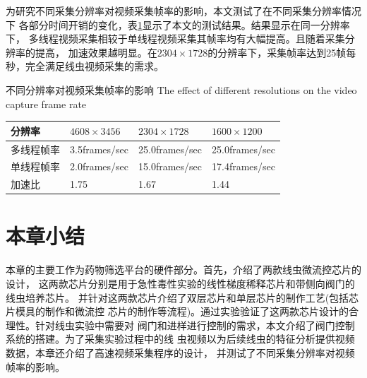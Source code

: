 	为研究不同采集分辨率对视频采集帧率的影响，本文测试了在不同采集分辨率情况下
	各部分时间开销的变化，表\ref{tab:resolutions}显示了本文的测试结果。结果显示在同一分辨率下，
	多线程视频采集相较于单线程视频采集其帧率均有大幅提高。且随着采集分辨率的提高，
	加速效果越明显。在$2304\times1728$的分辨率下，采集帧率达到25帧每秒，完全满足线虫视频采集的需求。
	\begin{table}[thbp]
	\centering
	\bicaption
    {不同分辨率对视频采集帧率的影响}
    {The effect of different resolutions on the video capture frame rate}
	\label{tab:resolutions}
	\begin{tabular}{p{80pt}p{80pt}p{80pt}p{80pt}}
	\toprule
	分辨率 & $4608\times3456$ & $2304\times1728$ & $1600\times1200$ \\
	\midrule
	多线程帧率 & 3.5frames/sec & 25.0frames/sec & 25.0frames/sec \\
	单线程帧率 & 2.0frames/sec  &15.0frames/sec &  17.4frames/sec \\
	加速比		&  1.75		  &   1.67        &  1.44 \\
	\bottomrule
	\end{tabular}
	\end{table}
\section{本章小结}
	本章的主要工作为药物筛选平台的硬件部分。首先，介绍了两款线虫微流控芯片的设计，
	这两款芯片分别是用于急性毒性实验的线性梯度稀释芯片和带侧向阀门的线虫培养芯片。
	并针对这两款芯片介绍了双层芯片和单层芯片的制作工艺(包括芯片模具的制作和微流控
	芯片的制作等流程)。通过实验验证了这两款芯片设计的合理性。针对线虫实验中需要对
	阀门和进样进行控制的需求，本文介绍了阀门控制系统的搭建。为了采集实验过程中的线
	虫视频以为后续线虫的特征分析提供视频数据，本章还介绍了高速视频采集程序的设计，
	并测试了不同采集分辨率对视频帧率的影响。 